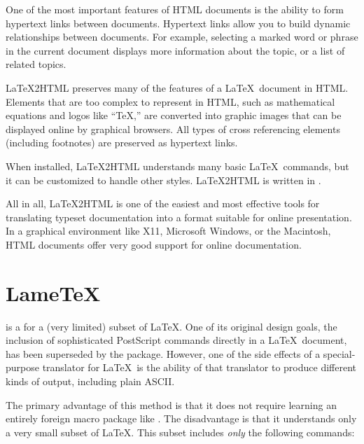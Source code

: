 \newpage
One of the most important features of HTML documents is the ability to
form hypertext links between 
documents.  Hypertext links allow you to
build dynamic relationships between documents.  For example, selecting
a marked word or phrase in the current document displays more
information about the topic, or a list of related topics.  

\LaTeX2HTML preserves many of the features of a \LaTeX\ document in 
HTML.  Elements that are too complex to represent in HTML, such
as mathematical equations and logos like ``\TeX,'' are converted into
graphic images that can be displayed online by graphical browsers.
All types of cross referencing elements (including footnotes) are preserved as
hypertext links.

When installed, \LaTeX2HTML understands many basic \LaTeX\ commands, but
it can be customized to handle other styles.  \LaTeX2HTML is written in
.

All in all, \LaTeX2HTML is one of the easiest and most effective tools
for translating typeset documentation into a format suitable for online
presentation.  In a graphical environment like X11, Microsoft Windows,
or the Macintosh, HTML documents offer very good support for online
documentation.

\section{Lame\protect\TeX}

 is a  for 
a (very limited) subset of
\LaTeX.  One of its original design goals, the inclusion of sophisticated
PostScript commands directly in a \LaTeX\ document, has been superseded
by the  package.
However, one of the side effects of a special-purpose translator for
\LaTeX\ is the ability of that translator to produce different kinds of
output, including plain ASCII.

The primary advantage of this method is that it does not require learning
an entirely foreign macro package like \TeXinfo.  The disadvantage
is that it understands only a very small subset of \LaTeX.
This subset includes \emph{only} the following commands: 

